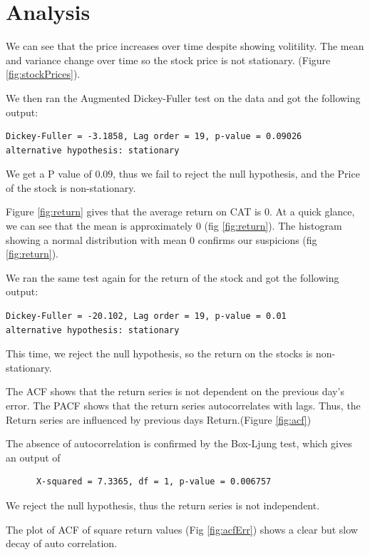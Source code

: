\documentclass{article}
\title {}
\author{Johnathan Ferdinand, Devina Gera, Archimedes Li, Henry Liu, \\Katherine Shi, Sam Stevens}
\date{\today}
\begin{document}
\maketitle

\section{Analysis}
We can see that the price increases over time despite showing volitility. The mean and variance change over time so the stock price is not stationary. (Figure \ref{fig:stockPrices}).

\noindent We then ran the Augmented Dickey-Fuller test on the data and got the following output:
\begin{verbatim}
Dickey-Fuller = -3.1858, Lag order = 19, p-value = 0.09026
alternative hypothesis: stationary
\end{verbatim}
We get a P value of $0.09$, thus we fail to reject the null hypothesis, and the Price of the stock is non-stationary.


\noindent Figure \ref{fig:return} gives that the average return on CAT is $0$. At a quick glance, we can see that the mean is approximately 0 (fig \ref{fig:return}). The histogram showing a normal distribution with mean 0 confirms our suspicions (fig \ref{fig:return}).

\noindent We ran the same test again for the return of the stock and got the following output:
\begin{verbatim}
Dickey-Fuller = -20.102, Lag order = 19, p-value = 0.01
alternative hypothesis: stationary
\end{verbatim}
This time, we reject the null hypothesis, so the return on the stocks is non-stationary.

\noindent The ACF shows that the return series is not dependent on the previous day's error.
          The PACF shows that the return series autocorrelates with lags.
	  Thus, the Return series are influenced by previous days Return.(Figure \ref{fig:acf})

	  \noindent The absence of autocorrelation is confirmed by the Box-Ljung test, which gives an output of 
	  \begin{verbatim}
	  X-squared = 7.3365, df = 1, p-value = 0.006757
	  \end{verbatim}
We reject the null hypothesis,  thus the return series is not independent.

\noindent The plot of ACF of square return values (Fig \ref{fig:acfErr}) shows a clear but slow decay of auto correlation.
\end{document}
